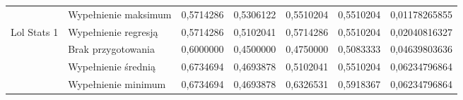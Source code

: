 \documentclass{book}
\begin{document}
\begin{table}[H]
\begin{tabular}{|l|l|r|r|r|r|r|}
                                  & Wypełnienie maksimum & \cellcolor[HTML]{67FD9A}0,5714286                                                & \cellcolor[HTML]{67FD9A}0,5306122                                                        & 0,5510204                                                                                          & \cellcolor[HTML]{FFCC67}0,5510204                                               & \cellcolor[HTML]{FFCC67}0,01178265855                                            \\ \cline{2-7} 
    \multirow{-5}{*}{Lol Stats 1} & Wypełnienie regresją & \cellcolor[HTML]{67FD9A}0,5714286                                                & 0,5102041                                                                                & 0,5714286                                                                                          & 0,5510204                                                                       & 0,02040816327                                                                    \\ \hline
                                  & Brak przygotowania   & 0,6000000                                                                        & 0,4500000                                                                                & 0,4750000                                                                                          & 0,5083333                                                                       & 0,04639803636                                                                    \\ \cline{2-7} 
                                  & Wypełnienie średnią  & \cellcolor[HTML]{67FD9A}0,6734694                                                & 0,4693878                                                                                & 0,5102041                                                                                          & 0,5510204                                                                       & 0,06234796864                                                                    \\ \cline{2-7} 
                                  & Wypełnienie minimum  & \cellcolor[HTML]{67FD9A}0,6734694                                                & 0,4693878                                                                                & \cellcolor[HTML]{67FD9A}0,6326531                                                                  & \cellcolor[HTML]{FFCC67}0,5918367                                               & \cellcolor[HTML]{FFCC67}0,06234796864                                            \\ \cline{2-7} 

\end{tabular}
\end{table}
\end{document}

